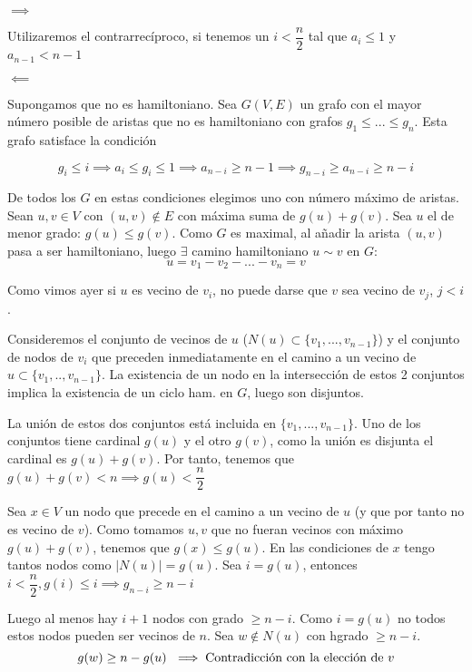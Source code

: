 \documentclass[openany]{book}
\begin{document}
\begin{demonstration}

    $ \implies $

    Utilizaremos el contrarrecíproco, si tenemos un $ i < \dfrac{n}{2} $ tal que $ a_i \leq 1 $ y $ a_{n-1} < n-1 $


    $ \impliedby $

    Supongamos que no es hamiltoniano. Sea $ G(V,E) $ un grafo con el mayor número posible de aristas que no es hamiltoniano con grafos $ g_{1}\leq...\leq g_n $. Esta grafo satisface la condición


    $$ g_i \leq i \implies a_i \leq g_i \leq 1 \implies a_{n-i} \geq n-1 \implies g_{n-i} \geq a_{n-i} \geq n-i $$

    De todos los $ G $ en estas condiciones elegimos uno con número máximo de aristas. Sean $ u,v \in V $ con $ (u,v) \not \in E $ con máxima suma de $ g(u)+g(v) $. Sea $ u $ el de menor grado: $ g(u) \leq g(v) $. Como $ G $ es maximal, al añadir la arista $ (u,v) $ pasa a ser hamiltoniano, luego $ \exists $ camino hamiltoniano $ u \sim v $ en $ G $:
    $$ u = v_1-v_2-...-v_n = v $$

    Como vimos ayer si $ u $ es vecino de $ v_{i} $, no puede darse que $ v $ sea vecino de $ v_{j} $, $ j<i $.

    Consideremos el conjunto de vecinos de $ u $ ($ N(u) \subset \{v_1,...,v_{n-1}\} $) y el conjunto de nodos de $ v_i $ que preceden inmediatamente en el camino a un vecino de $ u\subset \{v_1,..,v_{n-1}\} $. La existencia de un nodo en la intersección de estos 2 conjuntos implica la existencia de un ciclo ham. en $ G $, luego son disjuntos.

    La unión de estos dos conjuntos está incluida en $ \{v_1,...,v_{n-1}\} $. Uno de los conjuntos tiene cardinal $ g(u) $ y el otro $ g(v) $, como la unión es disjunta el cardinal es $ g(u) + g(v) $. Por tanto, tenemos que $ g(u)+g(v) < n \implies g(u) < \dfrac{n}{2} $

    Sea $ x \in V $ un nodo que precede en el camino a un vecino de $ u $ (y que por tanto no es vecino de $ v $). Como tomamos $ u,v $ que no fueran vecinos con máximo $ g(u)+g(v) $, tenemos que $ g(x) \leq g(u) $. En las condiciones de $ x $ tengo tantos nodos como $ |N(u)| = g(u) $. Sea $ i = g(u) $, entonces $ i<\dfrac{n}{2}, g(i) \leq i \implies g_{n-i} \geq n-i $

    Luego al menos hay  $ i+1 $ nodos  con grado  $ \geq n-i $. Como $ i = g(u) $ no todos estos nodos pueden ser vecinos de $ n $. Sea $ w \not \in N(u) $ con hgrado $ \geq n-i $.
    $$ g(w) \geq n-g(u)\ \implies \text{Contradicción con la elección de $ v $} $$


\end{demonstration}
\end{document}
